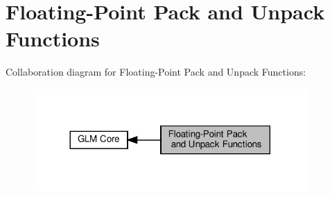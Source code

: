 \hypertarget{group__core__func__packing}{}\section{Floating-\/\+Point Pack and Unpack Functions}
\label{group__core__func__packing}
Collaboration diagram for Floating-\/\+Point Pack and Unpack Functions\+:\nopagebreak
\begin{figure}[H]
\begin{center}
\leavevmode
\includegraphics[width=296pt]{group__core__func__packing}
\end{center}
\end{figure}
